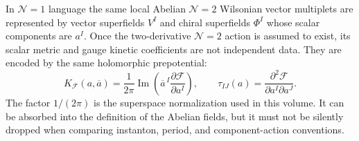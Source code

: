 In \(\mathcal N=1\) language the same local Abelian \(\mathcal N=2\)
Wilsonian vector multiplets are represented by vector superfields \(V^I\)
and chiral superfields \(\Phi^I\) whose scalar components are \(a^I\).  Once
the two-derivative \(\mathcal N=2\) action is assumed to exist, its scalar
metric and gauge kinetic coefficients are not independent data.  They are
encoded by the same holomorphic prepotential:
\begin{equation}
  K_{\mathcal F}(a,\overline a)
  =
  \frac1{2\pi}\operatorname{Im}
  \left(\overline a^{\,I}\frac{\partial\mathcal F}{\partial a^I}\right),
  \qquad
  \tau_{IJ}(a)=\frac{\partial^2\mathcal F}{\partial a^I\partial a^J}.
  \label{eq:rigid-special-kahler-potential}
\end{equation}
The factor \(1/(2\pi)\) is the superspace normalization used in this volume.
It can be absorbed into the definition of the Abelian fields, but it must not
be silently dropped when comparing instanton, period, and component-action
conventions.

